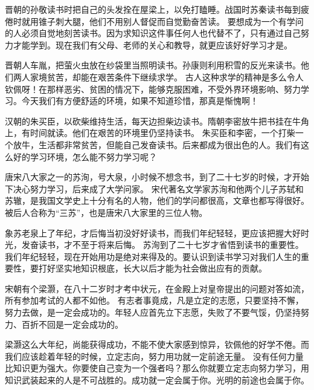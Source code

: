 \documentclass[avery5371,grid]{flashcards}
\begin{document}
{晋朝的孙敬读书时把自己的头发拴在屋梁上，以免打瞌睡。战国时苏秦读书每到疲倦时就用锥子刺大腿，他们不用别人督促而自觉勤奋苦读。} %
{要想成为一个有学问的人必须自觉地刻苦读书。因为求知识这件事任何人也代替不了，只有通过自己努力才能学到。现在我们有父母、老师的关心和教导，就更应该好好学习才是。} %

{晋朝人车胤，把萤火虫放在纱袋里当照明读书。孙康则利用积雪的反光来读书。他们两人家境贫苦，却能在艰苦条件下继续求学。} %
{古人这种求学的精神是多么令人钦佩呀！在那样恶劣、贫困的情况下，能够克服困难，不受外界环境影响、努力学习。今天我们有方便舒适的环境，如果不知道珍惜，那真是惭愧啊！} %

{汉朝的朱买臣，以砍柴维持生活，每天边担柴边读书。隋朝李密放牛把书挂在牛角上，有时间就读。他们在艰苦的环境里仍坚持读书。} %
{朱买臣和李密，一个打柴一个放牛，生活都非常贫苦，但能自己发奋读书。后来都成为很出色的人。我们有这么好的学习环境，怎么能不努力学习呢？} %

{唐宋八大家之一的苏洵，号大泉，小时候不想念书，到了二十七岁的时候，才开始下决心努力学习，后来成了大学问家。} %
{宋代著名文学家苏洵和他两个儿子苏轼和苏辙，是我国文学史上十分有名的人物，他们的学问都很高，文章也都写得很好。被后人合称为“三苏”，也是唐宋八大家里的三位人物。} %

{象苏老泉上了年纪，才后悔当初没好好读书，而我们年纪轻轻，更应该把握大好时光，发奋读书，才不至于将来后悔。} %
{苏洵到了二十七岁才省悟到读书的重要性。我们年纪轻轻，现在开始用功是绝对来得及的。要认识到读书学习对我们人生的重要性，要打好坚实地知识根底，长大以后才能为社会做出应有的贡献。} %

{宋朝有个梁灏，在八十二岁时才考中状元，在金殿上对皇帝提出的问题对答如流，所有参加考试的人都不如他。} %
{有志者事竟成，凡是立定的志愿，只要坚持不懈，努力去做，是一定会成功的。年轻人应首先立下志愿，失败了不要气馁，仍坚持努力、百折不回是一定会成功的。} %

{梁灏这么大年纪，尚能获得成功，不能不使大家感到惊异，钦佩他的好学不倦。而我们应该趁着年轻的时候，立定志向，努力用功就一定前途无量。} %
{没有任何力量比知识更为强大。你要使自己变为一个强者吗？那么你就要立定志向努力学习，用知识武装起来的人是不可战胜的。成功就一定会属于你。光明的前途也会属于你。} %
\end{document}
